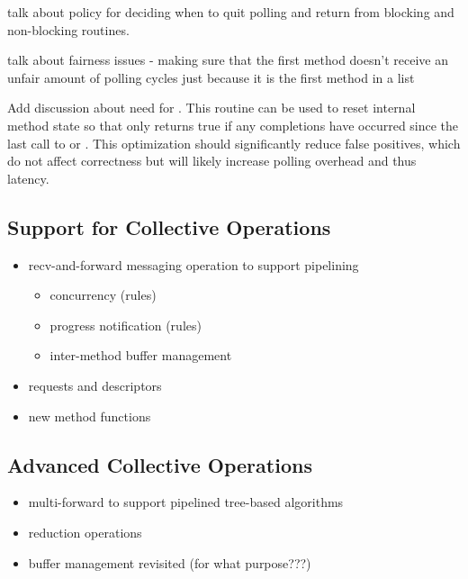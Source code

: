 \todo talk about policy for deciding when to quit polling and return from
blocking and non-blocking routines.

\todo talk about fairness issues - making sure that the first method doesn't
receive an unfair amount of polling cycles just because it is the first method
in a list

\todo Add discussion about need for .  This routine
can be used to reset internal method state so that  only
returns true if any completions have occurred since the last call to
 or .  This optimization should
significantly reduce false positives, which do not affect correctness but will
likely increase polling overhead and thus latency.


\subsection{Support for Collective Operations}

\begin{itemize}
\item recv-and-forward messaging operation to support pipelining
  \begin{itemize}
  \item concurrency (rules)
  \item progress notification (rules)
  \item inter-method buffer management
  \end{itemize}
\item requests and descriptors
\item new method functions
\end{itemize}


\subsection{Advanced Collective Operations}

\begin{itemize}
\item multi-forward to support pipelined tree-based algorithms
\item reduction operations
\item buffer management revisited (for what purpose???)
\end{itemize}


